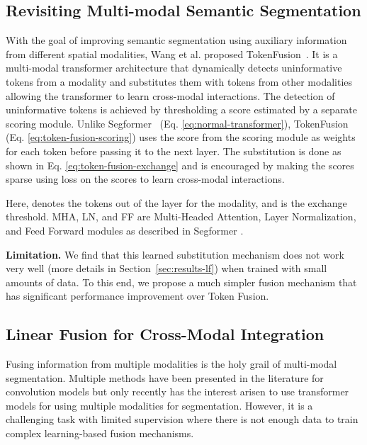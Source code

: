 \documentclass[10pt,twocolumn,letterpaper]{article}
\begin{document}
\subsection{Revisiting Multi-modal Semantic Segmentation}
\label{sec:revisiting-mm}

With the goal of improving semantic segmentation using auxiliary information from different spatial modalities, Wang et al. proposed TokenFusion~\cite{tokenfusion}. It is a multi-modal transformer architecture that dynamically detects uninformative tokens from a modality and substitutes them with tokens from other modalities allowing the transformer to learn cross-modal interactions. 
The detection of uninformative tokens is achieved by thresholding a score estimated by a separate scoring module. 
Unlike Segformer~\cite{segformer} (Eq. \ref{eq:normal-transformer}), TokenFusion (Eq. \ref{eq:token-fusion-scoring}) uses the score from the scoring module as weights for each token before passing it to the next layer. The substitution is done as shown in Eq. \ref{eq:token-fusion-exchange} and is encouraged by making the scores sparse using  loss on the scores to learn cross-modal interactions.



Here,  denotes the tokens out of the  layer for the  modality, and  is the exchange threshold. MHA, LN, and FF are Multi-Headed Attention, Layer Normalization, and Feed Forward modules as described in Segformer \cite{segformer}.

\noindent\textbf{Limitation.} We find that this learned substitution mechanism does not work very well (more details in Section~\ref{sec:results-lf}) when trained with small amounts of data.
To this end, we propose a much simpler fusion mechanism that has significant performance improvement over Token Fusion.



\subsection{Linear Fusion for Cross-Modal Integration}
\label{sec:method-lf}
Fusing information from multiple modalities is the holy grail of multi-modal segmentation. 
Multiple methods have been presented in the literature for convolution models \cite{cen, cfn, rdfnet, ssma, asymfusion} but only recently has the interest arisen to use transformer models for using multiple modalities for segmentation. 
However, it is a challenging task with limited supervision where there is not enough data to train complex learning-based fusion mechanisms. 
\end{document}
